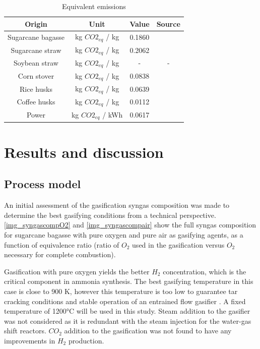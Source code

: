 \documentclass[a4paper, titlepage]{article}
\begin{document}
\begin{table}
	\centering
	\caption{Equivalent emissions}
	\label{tab_emissions}
	\begin{minipage}{\textwidth} \centering
	\begin{tabular}{|c | c | c | c |}
		\hline
		Origin & Unit & Value & Source \\
		\hline
		Sugarcane bagasse & kg $CO2_{eq}$ / kg & 0.1860 & \cite{jonkerEconomicPerformanceGHG2019} \\
		Sugarcane straw & kg $CO2_{eq}$ / kg  & 0.2062 & \cite{figueiredoGreenhouseGasEmissions2023} \\
		Soybean straw & kg $CO2_{eq}$ / kg  & -\footnotemark[1] & - \footnotemark[1]\\
		Corn stover & kg $CO2_{eq}$ / kg  & 0.0838 & \cite{searcyProcessingStrawCorn2008} \\
		Rice husks & kg $CO2_{eq}$ / kg  & 0.0639 & \cite{quispeLifeCycleAssessment2019} \\
		Coffee husks & kg $CO2_{eq}$ / kg  & 0.0112 & \cite{deoliveirafernandesLCAbasedCarbonFootprint2025} \\
		Power & kg $CO2_{eq}$ / kWh & 0.0617 & \cite{epeBENBalancoEnergetico2023} \\
	\hline	

	\end{tabular}
	\end{minipage}

\end{table}

\section{Results and discussion}

\subsection{Process model}

An initial assessment of the gasification syngas composition was made to determine the best gasifying conditions
from a technical perspective. \autoref{img_syngascompO2} and \autoref{img_syngascompair} show the full syngas
composition for sugarcane bagasse with pure oxygen and pure air as gasifying agents, as a function of equivalence ratio
(ratio of $O_2$ used in the gasification versus $O_2$ necessary for complete combustion).

Gasification with pure oxygen yields the better $H_2$ concentration, which is the critical component in ammonia 
synthesis. The best gasifying temperature in this case is close to 900 K, however this temperature is too low to 
guarantee tar cracking conditions and stable operation of an entrained flow gasifier 
\cite{basuBiomassGasificationPyrolysis2010}. A fixed temperature of 1200°C will be used in this study. Steam addition
to the gasifier was not considered as it is redundant with the steam injection for the water-gas shift reactors. $CO_2$
addition to the gasification was not found to have any improvements in $H_2$ production.
\end{document}
